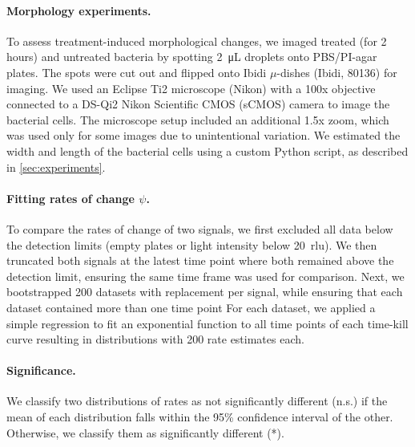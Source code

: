 \paragraph{Morphology experiments.}
To assess treatment-induced morphological changes, we imaged treated (for 2 hours) and untreated bacteria by spotting \SI{2}{\micro\liter} droplets onto PBS/PI-agar plates.
The spots were cut out and flipped onto Ibidi $\mu$-dishes (Ibidi, 80136) for imaging.
We used an Eclipse Ti2 microscope (Nikon) with a 100x objective connected to a DS-Qi2 Nikon Scientific CMOS (sCMOS) camera to image the bacterial cells.
The microscope setup included an additional 1.5x zoom, which was used only for some images due to unintentional variation.
We estimated the width and length of the bacterial cells using a custom Python script, as described in \autoref{sec:experiments}.

\paragraph{Fitting rates of change $\psi$.}
To compare the rates of change of two signals, we first excluded all data below the detection limits (empty plates or light intensity below \SI{20}{rlu}).
We then truncated both signals at the latest time point where both remained above the detection limit, ensuring the same time frame was used for comparison.
Next, we bootstrapped 200 datasets with replacement per signal, while ensuring that each dataset contained more than one time point
For each dataset, we applied a simple regression to fit an exponential function to all time points of each time-kill curve resulting in distributions with 200 rate estimates each.

\paragraph{Significance.}
We classify two distributions of rates as not significantly different (n.s.) if the mean of each distribution falls within the 95\% confidence interval of the other.
Otherwise, we classify them as significantly different (*).
